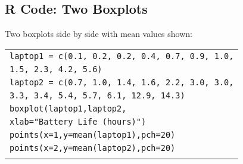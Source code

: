 \subsection{R Code: Two Boxplots}
\begin{frame}{\bf {}}
Two boxplots side by side with mean values shown:\\[0.2cm]
\begin{tabular}{|l|}
\hline
\texttt{laptop1 = c(0.1, 0.2,  0.2, 0.4,  0.7, 0.9,  1.0,}\\
\hspace{2.8cm}\texttt{1.5, 2.3,  4.2, 5.6)}\\
\texttt{laptop2 = c(0.7, 1.0, 1.4, 1.6, 2.2, 3.0, 3.0,}\\
\hspace{2.8cm}\texttt{3.3, 3.4, 5.4, 5.7, 6.1, 12.9, 14.3)}\\[0.2cm]
\texttt{boxplot(laptop1,laptop2,}\\
\hspace{2.8cm}\texttt{xlab="Battery Life (hours)")}\\
\texttt{points(x=1,y=mean(laptop1),pch=20)}\\
\texttt{points(x=2,y=mean(laptop2),pch=20)}\\
\hline
\multicolumn{1}{c}{}\\[-0.1cm]
\end{tabular}


 

\end{frame}


